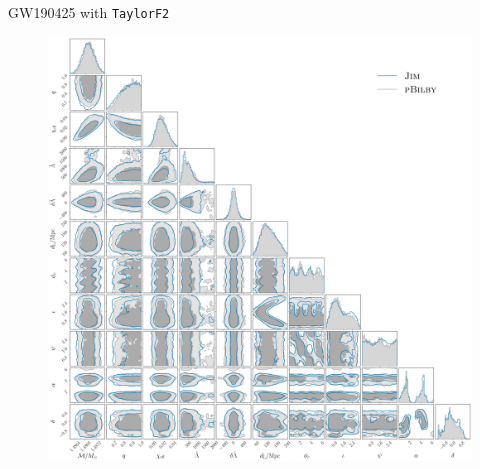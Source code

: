 \documentclass[usenames,dvipsnames,t]{beamer}
\begin{document}
\begin{frame}{GW190425 with \texttt{TaylorF2}}
  \vspace{-4.5mm}
  \begin{figure}
  
  \begin{minipage}[c]{0.2\textwidth}
    \caption{}\label{fig: GW190425 TaylorF2}
    \end{minipage}\hfill
    \begin{minipage}[c]{0.8\textwidth}
    \includegraphics[scale = 0.132]{Figures/GW190425_TaylorF2.pdf}
    \end{minipage}
  \end{figure}
\end{frame}
\end{document}
